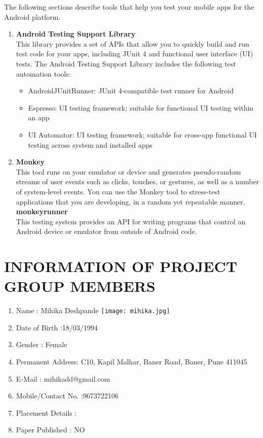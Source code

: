 \documentclass[12pt,a4paper]{report}
\begin{document}
\begin{appendices}
\begin{enumerate}
	The following sections describe tools that help you test your mobile apps for the Android platform.
	\begin{enumerate}
	\item	\textbf{Android Testing Support Library}\\
	This library provides a set of APIs that allow you to quickly build and run test code for your apps, including JUnit 4 and functional user interface (UI) tests. The Android Testing Support Library includes the following test automation tools:
	\begin{itemize}
	\item AndroidJUnitRunner: JUnit 4-compatible test runner for Android
	\item Espresso: UI testing framework; suitable for functional UI testing within an app
	\item UI Automator: UI testing framework; suitable for cross-app functional UI testing across system and installed apps
		\end{itemize}
	\item \textbf{Monkey}\\
	This tool runs on your emulator or device and generates pseudo-random streams of user events such as clicks, touches, or gestures, as well as a number of system-level events. You can use the Monkey tool to stress-test applications that you are developing, in a random yet repeatable manner. 
	\textbf{monkeyrunner}\\
	This testing system provides an API for writing programs that control an Android device or emulator from outside of Android code.
		\end{enumerate}
\end{enumerate}

\chapter{INFORMATION OF PROJECT GROUP MEMBERS}
\newpage

\begin{enumerate}
	\item Name :  Mihika Deshpande \hspace{80mm}\texttt{[image: mihika.jpg]}
	\item Date of Birth :18/03/1994
	\item Gender : Female
	\item Permanent Address: C10, Kapil Malhar, Baner Road, Baner, Pune 411045
	\item E-Mail : mihikadd@gmail.com
	\item Mobile/Contact No. :9673722106
	\item Placement Details :
	\item Paper Published : NO
	

\end{enumerate}
\end{appendices}
\end{document}
